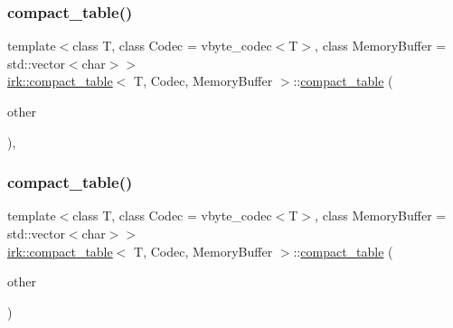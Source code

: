 \mbox{\label{classirk_1_1compact__table_ad80e786ec31ff54df435b3910c6c77e1}} 
\subsubsection{\texorpdfstring{compact\+\_\+table()}{compact\_table()}\hspace{0.1cm}{\footnotesize\ttfamily [2/3]}}
{\footnotesize\ttfamily template$<$class T, class Codec = vbyte\+\_\+codec$<$\+T$>$, class Memory\+Buffer = std\+::vector$<$char$>$$>$ \\
\mbox{\hyperlink{classirk_1_1compact__table}{irk\+::compact\+\_\+table}}$<$ T, Codec, Memory\+Buffer $>$\+::\mbox{\hyperlink{classirk_1_1compact__table}{compact\+\_\+table}} (\begin{DoxyParamCaption}\item[{\mbox{\hyperlink{classirk_1_1compact__table}{compact\+\_\+table}}$<$ T, Codec, Memory\+Buffer $>$ \&\&}]{other }\end{DoxyParamCaption})\hspace{0.3cm}{\ttfamily [default]}, {\ttfamily [noexcept]}}

\mbox{\label{classirk_1_1compact__table_a2f9719d8fda6a5db0aa3ea089a2b1274}} 
\subsubsection{\texorpdfstring{compact\+\_\+table()}{compact\_table()}\hspace{0.1cm}{\footnotesize\ttfamily [3/3]}}
{\footnotesize\ttfamily template$<$class T, class Codec = vbyte\+\_\+codec$<$\+T$>$, class Memory\+Buffer = std\+::vector$<$char$>$$>$ \\
\mbox{\hyperlink{classirk_1_1compact__table}{irk\+::compact\+\_\+table}}$<$ T, Codec, Memory\+Buffer $>$\+::\mbox{\hyperlink{classirk_1_1compact__table}{compact\+\_\+table}} (\begin{DoxyParamCaption}\item[{const \mbox{\hyperlink{classirk_1_1compact__table}{compact\+\_\+table}}$<$ T, Codec, Memory\+Buffer $>$ \&}]{other }\end{DoxyParamCaption})\hspace{0.3cm}{\ttfamily [default]}}

